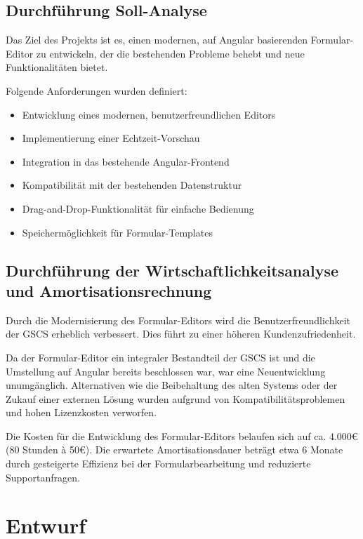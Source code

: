 \documentclass[a4paper,11pt]{article}
\begin{document}
\subsection{Durchführung Soll-Analyse}

Das Ziel des Projekts ist es, einen modernen, auf Angular basierenden Formular-Editor zu entwickeln, der die bestehenden Probleme behebt und neue Funktionalitäten bietet.

Folgende Anforderungen wurden definiert:

\begin{itemize}
\item Entwicklung eines modernen, benutzerfreundlichen Editors
\item Implementierung einer Echtzeit-Vorschau
\item Integration in das bestehende Angular-Frontend
\item Kompatibilität mit der bestehenden Datenstruktur
\item Drag-and-Drop-Funktionalität für einfache Bedienung
\item Speichermöglichkeit für Formular-Templates
\end{itemize}

\subsection{Durchführung der Wirtschaftlichkeitsanalyse und Amortisationsrechnung}

Durch die Modernisierung des Formular-Editors wird die Benutzerfreundlichkeit der GSCS erheblich verbessert. Dies führt zu einer höheren Kundenzufriedenheit.

Da der Formular-Editor ein integraler Bestandteil der GSCS ist und die Umstellung auf Angular bereits beschlossen war, war eine Neuentwicklung unumgänglich. Alternativen wie die Beibehaltung des alten Systems oder der Zukauf einer externen Lösung wurden aufgrund von Kompatibilitätsproblemen und hohen Lizenzkosten verworfen.

Die Kosten für die Entwicklung des Formular-Editors belaufen sich auf ca. 4.000€ (80 Stunden à 50€). Die erwartete Amortisationsdauer beträgt etwa 6 Monate durch gesteigerte Effizienz bei der Formularbearbeitung und reduzierte Supportanfragen.

\section{Entwurf}
\end{document}
